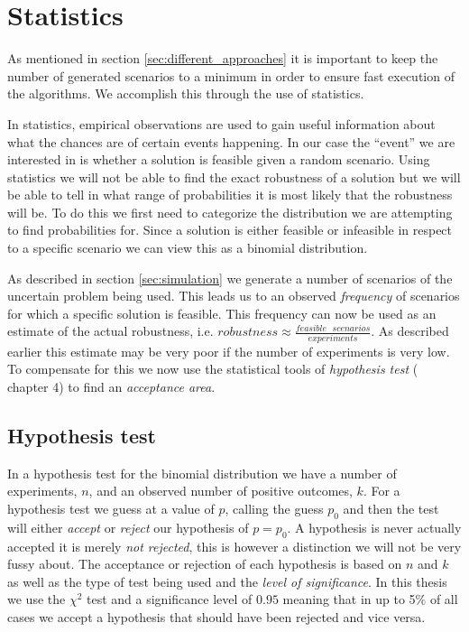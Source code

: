 \section{Statistics}
\label{sec:statistics}
As mentioned in section \ref{sec:different_approaches} it is important
to keep the number of generated scenarios to a minimum in order to
ensure fast execution of the algorithms. We accomplish this through
the use of statistics. 

In statistics, empirical observations are used to gain useful
information about what the chances are of certain events happening. In
our case the ``event'' we are interested in is whether a solution is
feasible given a random scenario.  Using statistics we will not be
able to find the exact robustness of a solution but we will be able to
tell in what range of probabilities it is most likely that the
robustness will be. To do this we first need to categorize the
distribution we are attempting to find probabilities for. Since a
solution is either feasible or infeasible in respect to a specific
scenario we can view this as a binomial distribution.

As described in section \ref{sec:simulation} we generate a number of
scenarios of the uncertain problem being used. This leads us to an
observed \emph{frequency} of scenarios for which a specific solution
is feasible. This frequency can now be used as an estimate of the
actual robustness, i.e. $robustness \approx \frac{feasible \text{ }
scenarios}{experiments}$. As described earlier this estimate may be
very poor if the number of experiments is very low. To compensate for
this we now use the statistical tools of \emph{hypothesis test}
(\cite{statistik} chapter 4) to find an \emph{acceptance area}.

\subsection{Hypothesis test}
In a hypothesis test for the binomial distribution we have a number of
experiments, $n$, and an observed number of positive outcomes, $k$.
For a hypothesis test we guess at a value of $p$, calling the
guess $p_0$ and then the test will either \emph{accept} or
\emph{reject} our hypothesis of $p = p_0$. A hypothesis is
  never actually accepted it is merely \emph{not rejected}, this is
  however a distinction we will not be very fussy about. The
acceptance or rejection of each hypothesis is based on $n$ and $k$ as
well as the type of test being used and the \emph{level of
significance}. In this thesis we use the $\chi^2$ test and a
significance level of $0.95$ meaning that in up to 5$\%$ of all cases we
accept a hypothesis that should have been rejected and vice versa.

